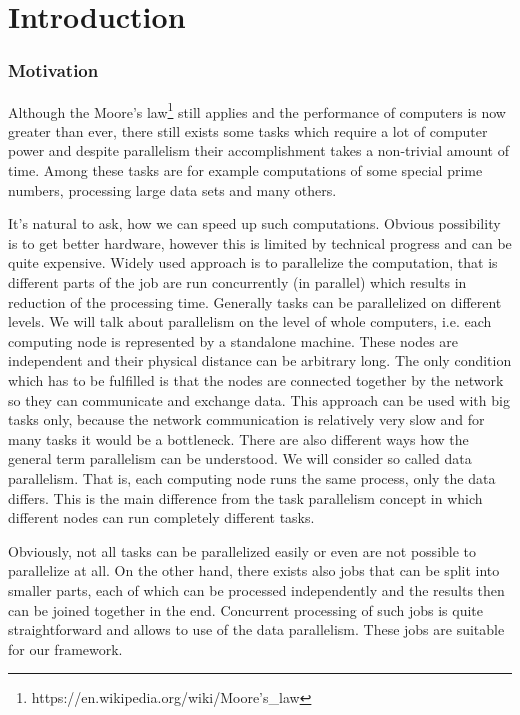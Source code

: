\chapter*{Introduction}
\subsection*{Motivation}

Although the Moore's law\footnote{https://en.wikipedia.org/wiki/Moore's\_law} still applies and the performance of computers is now greater than ever, there still exists some tasks which require a lot of computer power and despite parallelism their accomplishment takes a non-trivial amount of time. Among these tasks are for example computations of some special prime numbers, processing large data sets and many others.

It's natural to ask, how we can speed up such computations. Obvious possibility is to get better hardware, however this is limited by technical progress and can be quite expensive. Widely used approach is to parallelize the computation, that is different parts of the job are run concurrently (in parallel) which results in reduction of the processing time. Generally tasks can be parallelized on different levels. We will talk about parallelism on the level of whole computers, i.e. each computing node is represented by a standalone machine. These nodes are independent and their physical distance can be arbitrary long. The only condition which has to be fulfilled is that the nodes are connected together by the network so they can communicate and exchange data. This approach can be used with big tasks only, because the network communication is relatively very slow and for many tasks it would be a bottleneck. There are also different ways how the general term parallelism can be understood. We will consider so called data parallelism. That is, each computing node runs the same process, only the data differs. This is the main difference from the task parallelism concept in which different nodes can run completely different tasks.

Obviously, not all tasks can be parallelized easily or even are not possible to parallelize at all. On the other hand, there exists also jobs that can be split into smaller parts, each of which can be processed independently and the results then can be joined together in the end. Concurrent processing of such jobs is quite straightforward and allows to use of the data parallelism. These jobs are suitable for our framework.

